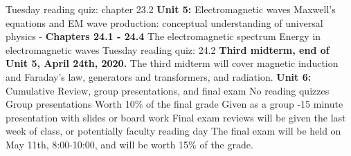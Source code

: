 \documentclass[10pt]{article}
\begin{document}
\begin{outline}[enumerate]
\3 Tuesday reading quiz: chapter 23.2
\1 \textbf{Unit 5:} Electromagnetic waves
\2 Maxwell's equations and EM wave production: conceptual understanding of universal physics - \textbf{Chapters 24.1 - 24.4}
\3 The electromagnetic spectrum
\3 Energy in electromagnetic waves
\3 Tuesday reading quiz: 24.2
\1 \textbf{Third midterm, end of Unit 5, April 24th, 2020.} The third midterm will cover magnetic induction and Faraday's law, generators and transformers, and radiation.
\1 \textbf{Unit 6:} Cumulative Review, group presentations, and final exam
\2 No reading quizzes
\2 Group presentations
\3 Worth 10\% of the final grade
\3 Given as a group
-15 minute presentation with slides or board work
\3 Final exam reviews will be given the last week of class, or potentially faculty reading day
\3 The final exam will be held on May 11th, 8:00-10:00, and will be worth 15\% of the grade.
\end{outline}
\end{document}
